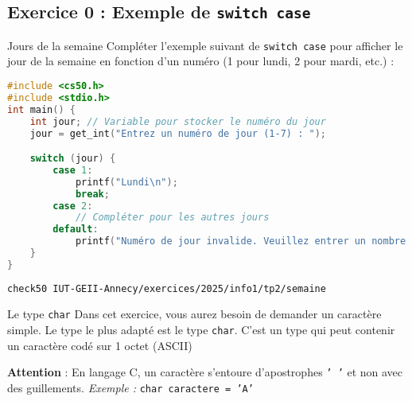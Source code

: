 \subsection{Exercice 0 : Exemple de \texttt{switch case}}
\begin{UPSTIManipulation}{Jours de la semaine}
    Compléter l'exemple suivant de \texttt{switch case} pour afficher le jour de la semaine en fonction d'un numéro (1 pour lundi, 2 pour mardi, etc.) :

\begin{lstlisting}[language=c]
#include <cs50.h>
#include <stdio.h>
int main() {
    int jour; // Variable pour stocker le numéro du jour
    jour = get_int("Entrez un numéro de jour (1-7) : ");

    switch (jour) {
        case 1:
            printf("Lundi\n");
            break;
        case 2:
            // Compléter pour les autres jours
        default:
            printf("Numéro de jour invalide. Veuillez entrer un nombre entre 1 et 7.\n");
    }
}
\end{lstlisting}
\tcblower 
\begin{lstlisting}
check50 IUT-GEII-Annecy/exercices/2025/info1/tp2/semaine
\end{lstlisting}
\end{UPSTIManipulation}

\begin{UPSTIinfor}{Le type \texttt{char}}
	Dans cet exercice, vous aurez besoin de demander un caractère simple. Le type le plus adapté est le type \texttt{char}.
	C'est un type qui peut contenir un caractère codé sur 1 octet (ASCII)

	\textbf{Attention} : En langage C, un caractère s'entoure d'apostrophes \texttt{' '} et non avec des guillements.
	\textit{Exemple :} \texttt{char caractere = 'A'}
\end{UPSTIinfor}